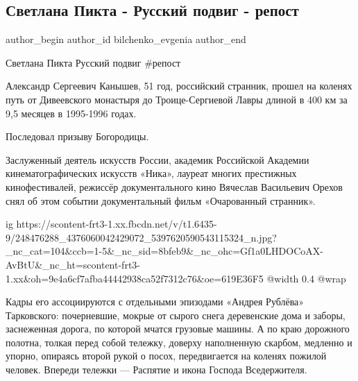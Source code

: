  
 
 
 
 
 
\subsection{Светлана Пикта - Русский  подвиг - репост}
\label{sec:25_10_2021.fb.bilchenko_evgenia.1.russkij_podvig_kanyshev_aleksej}
 
\ifcmt
 author_begin
   author_id bilchenko_evgenia
 author_end
\fi

Светлана Пикта Русский  подвиг \#репост

Александр Сергеевич Канышев, 51 год, российский странник, прошел на коленях
путь от Дивеевского монастыря до Троице-Сергиевой Лавры длиной в 400 км за 9,5
месяцев в 1995-1996 годах.

Последовал призыву Богородицы.

Заслуженный деятель искусств России, академик Российской Академии
кинематографических искусств «Ника», лауреат многих престижных кинофестивалей,
режиссёр документального кино Вячеслав Васильевич Орехов снял об этом событии
документальный фильм «Очарованный странник».

\ifcmt
  ig https://scontent-frt3-1.xx.fbcdn.net/v/t1.6435-9/248476288_4376060042429072_5397620590543115324_n.jpg?_nc_cat=104&ccb=1-5&_nc_sid=8bfeb9&_nc_ohc=Gf1a0LHDOCoAX-AvBtU&_nc_ht=scontent-frt3-1.xx&oh=9e4a6cf7afba44442938ca52f7312c76&oe=619E36F5
  @width 0.4
  @wrap 
\fi

Кадры его ассоциируются с отдельными эпизодами «Андрея Рублёва» Тарковского:
почерневшие, мокрые от сырого снега деревенские дома и заборы, заснеженная
дорога, по которой мчатся грузовые машины. А по краю дорожного полотна, толкая
перед собой тележку, доверху наполненную скарбом, медленно и упорно, опираясь
второй рукой о посох, передвигается на коленях пожилой человек. Впереди тележки
— Распятие и икона Господа Вседержителя.

